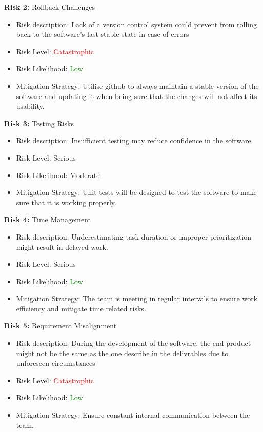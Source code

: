 \documentclass{article}
\begin{document}
\textbf{Risk 2:} Rollback Challenges
\begin{itemize}
    \item Risk description: Lack of a version control system could prevent from rolling back to the software's last stable state in case of errors
    \item Risk Level: \textcolor{Red}{Catastrophic}
    \item Risk Likelihood: \textcolor{Green}{Low}
    \item Mitigation Strategy: Utilise github to always maintain a stable version of the software and updating it when being sure that the changes will not affect its usability. 
\end{itemize}


\textbf{Risk 3:} Testing Risks	
\begin{itemize}
    \item Risk description: Insufficient testing may reduce confidence in the software
    \item Risk Level: \textcolor{BurntOrange}{Serious}
    \item Risk Likelihood: \textcolor{BurntOrange}{Moderate}
    \item Mitigation Strategy: Unit tests will be designed to test the software to make sure that it is working properly.
\end{itemize}

\textbf{Risk 4:} Time Management
\begin{itemize}
    \item Risk description: Underestimating  task duration or improper prioritization might result in delayed work.
    \item Risk Level: \textcolor{BurntOrange}{Serious}
    \item Risk Likelihood: \textcolor{Green}{Low}
    \item Mitigation Strategy: The team is meeting in regular intervals to ensure work efficiency and mitigate time related risks.
\end{itemize}

\textbf{Risk 5:} Requirement Misalignment 
\begin{itemize}
    \item Risk description: During the development of the software, the end product might not be the same as the one describe in the delivrables due to unforeseen circumstances
    \item Risk Level: \textcolor{Red}{Catastrophic}
    \item Risk Likelihood: \textcolor{Green}{Low}
    \item Mitigation Strategy: Ensure constant internal communication between the team.
\end{itemize}
\end{document}
